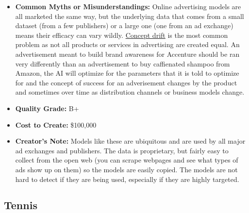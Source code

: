 \begin{itemize}
\begin{itemize}
    \item \textbf{Common Myths or Misunderstandings:} Online advertising models are all marketed the same way, but the underlying data that comes from a small dataset (from a few publishers) or a large one (one from an ad exchange) means their efficacy can vary wildly. \hyperref[sec:drift]{Concept drift} is the most common problem as not all products or services in advertising are created equal. An advertisement meant to build brand awareness for Accenture should be ran very differently than an advertisement to buy caffienated shampoo from Amazon, the AI will optimize for the parameters that it is told to optimize for and the concept of success for an adverisement changes by the product and sometimes over time as distribution channels or business models change.  
    \item \textbf{Quality Grade:} B+
    \item \textbf{Cost to Create:} \$100,000
    \item \textbf{Creator's Note:} Models like these are ubiquitous and are used by all major ad exchanges and publishers. The data is proprietary, but fairly easy to collect from the open web (you can scrape webpages and see what types of ads show up on them) so the models are easily copied. The models are not hard to detect if they are being used, especially if they are highly targeted.
\end{itemize}

\subsection{Tennis}


\end{itemize}
